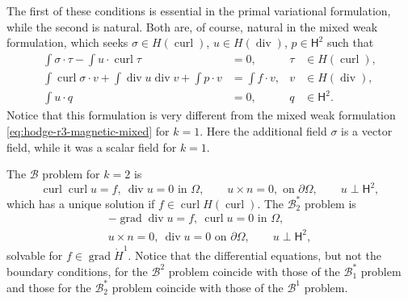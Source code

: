 {The first of these conditions is essential in the primal variational formulation, while the second is natural. Both are, of course, natural in the mixed weak formulation, which seeks $\sigma\in H(\operatorname{curl})$, $u\in H(\operatorname{div})$, $p\in\mathsf H^2$ such that}
\begin{equation}\label{eq:hodge-r3-electric-mixed}
\begin{aligned}
\int\sigma\cdot\tau-\int u\cdot\operatorname{curl}\tau&=0,&\tau&\in H(\operatorname{curl}),\\
\int\operatorname{curl}\sigma\cdot v+\int\operatorname{div}u\operatorname{div}v+\int p\cdot v&=\int f\cdot v,&v&\in H(\operatorname{div}),\\
\int u\cdot q&=0,&q&\in\mathsf H^2.
\end{aligned}
\end{equation}
{Notice that this formulation is very different from the mixed weak formulation \eqref{eq:hodge-r3-magnetic-mixed} for $k=1$. Here the additional field $\sigma$ is a vector field, while it was a scalar field for $k=1$.}

{The $\mathcal B$ problem for $k=2$ is}
\[
\operatorname{curl}\operatorname{curl}u=f,\ \operatorname{div}u=0\text{ in }\Omega,\qquad u\times n=0,\text{ on }\partial\Omega,\qquad u\perp\mathsf H^2,
\]
{which has a unique solution if $f\in\operatorname{curl}H(\operatorname{curl})$. The $\mathcal B_2^*$ problem is}
\[
\begin{gathered}
-\operatorname{grad}\operatorname{div}u=f,\ \operatorname{curl}u=0\text{ in }\Omega,\\
u\times n=0,\ \operatorname{div}u=0\text{ on }\partial\Omega,\qquad u\perp\mathsf H^2,
\end{gathered}
\]
{solvable for $f\in\operatorname{grad}\mathring H^1$. Notice that the differential equations, but not the boundary conditions, for the $\mathcal B^2$ problem coincide with those of the $\mathcal B_1^*$ problem and those for the $\mathcal B_2^*$ problem coincide with those of the $\mathcal B^1$ problem.}

